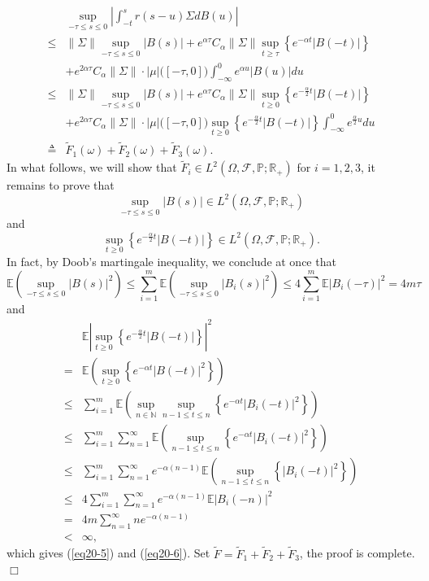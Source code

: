\documentclass[preprint,12pt]{elsarticle}
\begin{document}
\begin{align}\label{eq20-4}
&\sup_{-\tau\leq s\leq0}\left|\int_{-t}^s r(s-u)\Sigma dB(u)\right|\nonumber\\
\leq&\|\Sigma\|\sup_{-\tau\leq s\leq0}|B(s)|+e^{\alpha\tau}C_\alpha\|\Sigma\|\sup_{t\geq\tau}\left\{e^{-\alpha t}|B(-t)|\right\} \nonumber\\
&+e^{2\alpha\tau}C_\alpha\|\Sigma\|\cdot|\mu|\bigl([-\tau,0]\bigr)\int_{-\infty}^{0}e^{\alpha u}|B(u)|du\nonumber\\
\leq&\|\Sigma\|\sup_{-\tau\leq s\leq0}|B(s)|+e^{\alpha\tau}C_\alpha\|\Sigma\|\sup_{t\geq0}\left\{e^{-\frac\alpha2t}|B(-t)|\right\}\nonumber\\
&+e^{2\alpha\tau}C_\alpha\|\Sigma\|\cdot|\mu|\bigl([-\tau,0]\bigr)\sup_{t\geq0}\left\{e^{-\frac\alpha2t}|B(-t)|\right\}\int_{-\infty}^{0}e^{\frac\alpha2u}du\nonumber\\
\triangleq&\widetilde{F}_1(\omega)+\widetilde{F}_2(\omega)+\widetilde{F}_3(\omega).
\end{align}
In what follows, we will show that $\widetilde{F}_i\in L^2(\Omega,\mathscr{F},\mathbb{P};\mathbb{R}_+)$ for $i=1,2,3$, it remains to prove that
\begin{equation}\label{eq20-5}
\sup_{-\tau\leq s\leq0}|B(s)|\in L^2(\Omega,\mathscr{F},\mathbb{P};\mathbb{R}_+)
\end{equation}
and
\begin{equation}\label{eq20-6}
\sup_{t\geq0}\left\{e^{-\frac\alpha2t}|B(-t)|\right\}\in L^2(\Omega,\mathscr{F},\mathbb{P};\mathbb{R}_+).
\end{equation}
In fact, by Doob's martingale inequality, we conclude at once that
\begin{equation}\label{eq20-7}
\mathbb{E}\left(\sup_{-\tau\leq s\leq0}|B(s)|^2\right)\leq\sum_{i=1}^m\mathbb{E}\left(\sup_{-\tau\leq s\leq0}|B_i(s)|^2\right)\leq4\sum_{i=1}^m\mathbb{E}|B_i(-\tau)|^2=4m\tau
\end{equation}
and
\begin{align}\label{eq20-8}
&\mathbb{E}\left|\sup_{t\geq0}\left\{e^{-\frac\alpha2t}|B(-t)|\right\}\right|^2\nonumber\\
=&\mathbb{E}\left(\sup_{t\geq0}\left\{e^{-\alpha t}|B(-t)|^2\right\}\right)\nonumber\\
\leq&\sum_{i=1}^m\mathbb{E}\left(\sup_{n\in\mathbb{N}}\sup_{n-1\leq t\leq n}\left\{e^{-\alpha t}|B_i(-t)|^2\right\}\right)\nonumber\\
\leq&\sum_{i=1}^m\sum_{n=1}^\infty\mathbb{E}\left(\sup_{n-1\leq t\leq n}\left\{e^{-\alpha t}|B_i(-t)|^2\right\}\right)\nonumber\\
\leq&\sum_{i=1}^m\sum_{n=1}^\infty e^{-\alpha(n-1)}\mathbb{E}\left(\sup_{n-1\leq t\leq n}\left\{|B_i(-t)|^2\right\}\right)\nonumber\\
\leq&4\sum_{i=1}^m\sum_{n=1}^\infty e^{-\alpha(n-1)}\mathbb{E}|B_i(-n)|^2\nonumber\\
=&4m\sum_{n=1}^\infty ne^{-\alpha(n-1)}\nonumber\\
<&\infty,
\end{align}
which gives (\ref{eq20-5}) and (\ref{eq20-6}). Set $\widetilde{F}=\widetilde{F}_1+\widetilde{F}_2+\widetilde{F}_3$, the proof is complete.\quad\quad$\Box$
\end{document}
